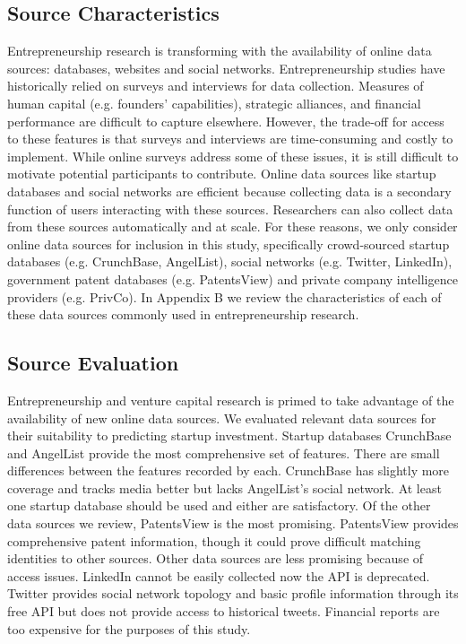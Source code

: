 \documentclass[../thesis/thesis.tex]{subfiles}
\begin{document}
\begin{refsection}
\subsection{Source Characteristics}

Entrepreneurship research is transforming with the availability of online data sources: databases, websites and social networks. Entrepreneurship studies have historically relied on surveys and interviews for data collection. Measures of human capital (e.g. founders' capabilities), strategic alliances, and financial performance are difficult to capture elsewhere. However, the trade-off for access to these features is that surveys and interviews are time-consuming and costly to implement. While online surveys address some of these issues, it is still difficult to motivate potential participants to contribute. Online data sources like startup databases and social networks are efficient because collecting data is a secondary function of users interacting with these sources. Researchers can also collect data from these sources automatically and at scale. For these reasons, we only consider online data sources for inclusion in this study, specifically crowd-sourced startup databases (e.g. CrunchBase, AngelList), social networks (e.g. Twitter, LinkedIn), government patent databases (e.g. PatentsView) and private company intelligence providers (e.g. PrivCo). In Appendix B we review the characteristics of each of these data sources commonly used in entrepreneurship research.

\subsection{Source Evaluation}

Entrepreneurship and venture capital research is primed to take advantage of the availability of new online data sources. We evaluated relevant data sources for their suitability to predicting startup investment. Startup databases CrunchBase and AngelList provide the most comprehensive set of features. There are small differences between the features recorded by each. CrunchBase has slightly more coverage and tracks media better but lacks AngelList's social network. At least one startup database should be used and either are satisfactory. Of the other data sources we review, PatentsView  is the most promising. PatentsView provides comprehensive patent information, though it could prove difficult matching identities to other sources. Other data sources are less promising because of access issues. LinkedIn cannot be easily collected now the API is deprecated. Twitter provides social network topology and basic profile information through its free API but does not provide access to historical tweets. Financial reports are too expensive for the purposes of this study.


\end{refsection}
\end{document}
